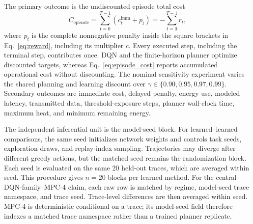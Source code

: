 \documentclass[remotesensing,article,submit,moreauthors]{Definitions/mdpi}
\newenvironment{revisedblock}{\color{red}}{}
\newenvironment{revisedblock}{}{}
\begin{document}
The primary outcome is the undiscounted episode total cost
\begin{equation}
C_{\mathrm{episode}}=\sum_{t=0}^{T-1}\left(c^{\mathrm{imm}}_t+p_t\right)=-\sum_{t=0}^{T-1}r_t,
\label{eq:episode_cost}
\end{equation}
\begin{revisedblock}
where $p_t$ is the complete nonnegative penalty inside the square brackets in Eq.~\eqref{eq:reward}, including its multiplier $c$. Every executed step, including the terminal step, contributes once. DQN and the finite-horizon planner optimize discounted targets, whereas Eq.~\eqref{eq:episode_cost} reports accumulated operational cost without discounting. The nominal sensitivity experiment varies the shared planning and learning discount over $\gamma\in\{0.90,0.95,0.97,0.99\}$. Secondary outcomes are immediate cost, delayed penalty, energy use, modeled latency, transmitted data, threshold-exposure steps, planner wall-clock time, maximum heat, and minimum remaining energy.
\end{revisedblock}

The independent inferential unit is the model-seed block. For learned--learned comparisons, the same seed initializes network weights and controls task seeds, exploration draws, and replay-index sampling. Trajectories may diverge after different greedy actions, but the matched seed remains the randomization block. Each seed is evaluated on the same 20 held-out traces, which are averaged within seed. This procedure gives $n=20$ blocks per learned method. For the central DQN-family--MPC-4 claim, each raw row is matched by regime, model-seed trace namespace, and trace seed. Trace-level differences are then averaged within seed. MPC-4 is deterministic conditional on a trace; its model-seed field therefore indexes a matched trace namespace rather than a trained planner replicate.
\end{document}
